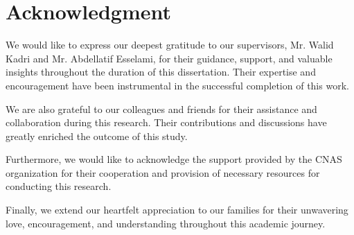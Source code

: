 \documentclass[12pt]{report}
\begin{document}
        \vspace*{\fill}
        \section*{\centering Acknowledgment}

        We would like to express our deepest gratitude to our supervisors, Mr. Walid Kadri and Mr. Abdellatif Esselami, for their guidance, support, and valuable insights throughout the duration of this dissertation. Their expertise and encouragement have been instrumental in the successful completion of this work.
        
        We are also grateful to our colleagues and friends for their assistance and collaboration during this research. Their contributions and discussions have greatly enriched the outcome of this study.
        
        Furthermore, we would like to acknowledge the support provided by the CNAS organization for their cooperation and provision of necessary resources for conducting this research.
        
        Finally, we extend our heartfelt appreciation to our families for their unwavering love, encouragement, and understanding throughout this academic journey.
        
\end{document}
